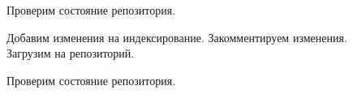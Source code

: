 \begin{figure}[h]
	\caption{Проверим состояние репозитория.}
	\label{ris:image}
\end{figure}
\hfill
\begin{figure}[h]
	\caption{Добавим изменения на индексирование. Закомментируем изменения. Загрузим на репозиторий.}
	\label{ris:image}
\end{figure}
\hfill
\begin{figure}[h!]
	\caption{Проверим состояние репозитория.}
	\label{ris:image}
\end{figure}
